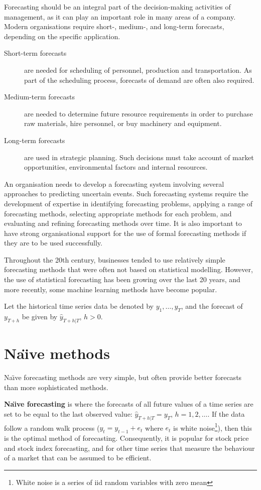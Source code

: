 \documentclass[a4paper,10pt]{article}
\begin{document}
Forecasting should be an integral part of the decision-making activities of management, as it can play an important role in many areas of a company. Modern organisations require short-, medium-, and long-term forecasts, depending on the specific application.
\begin{description}
	\item[Short-term forecasts] are needed for scheduling of personnel, production and transportation. As part of the scheduling process, forecasts of demand are often also required.
	\item[Medium-term forecasts] are needed to determine future resource requirements in order to purchase raw materials, hire personnel, or buy machinery and equipment.
	\item[Long-term forecasts] are used in strategic planning. Such decisions must take account of market opportunities, environmental factors and internal resources.
\end{description}
An organisation needs to develop a forecasting system involving several approaches to predicting uncertain events. Such forecasting systems require the development of expertise in identifying forecasting problems, applying a range of forecasting methods, selecting appropriate methods for each problem, and evaluating and refining forecasting methods over time. It is also important to have strong organisational support for the use of formal forecasting methods if they are to be used successfully.

Throughout the 20th century, businesses tended to use relatively simple forecasting methods that were often not based on statistical modelling. However, the use of statistical forecasting has been growing over the last 20 years, and more recently, some machine learning methods have become popular.

Let the historical time series data be denoted by $y_1,\dots,y_T$, and the forecast of $y_{T+h}$ be given by $\hat{y}_{T+h|T}$, $h>0$.

\section{Na\"{\i}ve methods}

Na\"{\i}ve forecasting methods are very simple, but often provide better forecasts than more sophisticated methods.

\textbf{Na\"{\i}ve forecasting} is where the forecasts of all future values of a time series are set to be equal to the last observed value: $\hat{y}_{T+h|T}=y_T$, $h=1,2,\dots$. If the data follow a random walk process ($y_t=y_{t-1}+e_t$ where $e_t$ is white noise\footnote{White noise is a series of iid random variables with zero mean}), then this is the optimal method of forecasting. Consequently, it is popular for stock price and stock index forecasting, and for other time series that measure the behaviour of a market that can be assumed to be efficient.
\end{document}
